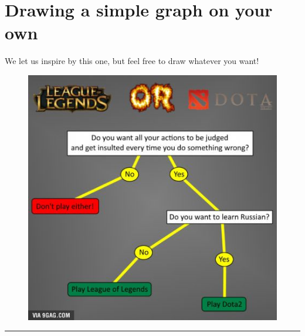 \documentclass[12pt]{article}
\begin{document}
\section*{Drawing a simple graph on your own}

We let us inspire by this one, but feel free to draw whatever you want!
\vspace{1em}

\begin{figure}[H]
    \centering
    \includegraphics[scale=0.45]{target.jpg}
\end{figure}

\vspace{1em}
\hrule 
\vspace{1em}


\begin{tikzpicture}
\end{tikzpicture}
\end{document}
